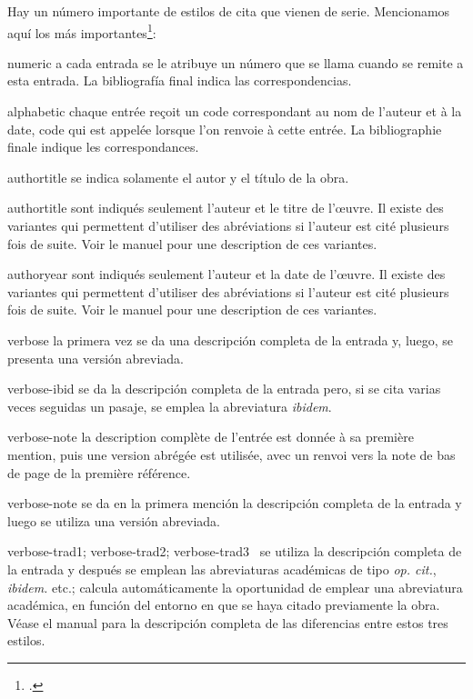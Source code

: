 Hay un número importante de estilos de cita que vienen de
serie. Mencionamos aquí los más importantes\footcite[Para más
detalles, véase][]{biblatex_style}:
\begin{choix}
\item[numeric]a cada entrada se le atribuye un número que se llama
  cuando se remite a esta entrada. La bibliografía final indica las correspondencias.
\item[alphabetic]chaque entrée reçoit un code correspondant au nom de l'auteur et à la date, code qui est appelée lorsque l'on renvoie à cette entrée. La bibliographie finale indique les correspondances.%
\item[authortitle]se indica solamente el autor y el título de la obra.
\item[authortitle]sont indiqués seulement l'auteur et le titre de l'œuvre. Il existe des variantes qui permettent d'utiliser des abréviations si l'auteur est cité plusieurs fois de suite. Voir le manuel pour une description de ces variantes.%
\item[authoryear]sont indiqués seulement l'auteur et la date de l'œuvre. Il existe des variantes qui permettent d'utiliser des abréviations si l'auteur est cité plusieurs fois de suite. Voir le manuel pour une description de ces variantes.%
\item[verbose]la primera vez se da una descripción completa de la
  entrada y, luego, se presenta una versión abreviada.
\item[verbose-ibid]se da la descripción completa de la entrada pero,
  si se cita varias veces seguidas un pasaje, se emplea la abreviatura \emph{ibidem}.
  \item[verbose-note]la description complète de l'entrée est donnée à sa première mention, puis une version abrégée est utilisée, avec un renvoi vers la note de bas de page de la première référence.%
\item[verbose-note]se da en la primera mención la descripción completa
  de la entrada y luego se utiliza una versión abreviada.
\item[verbose-trad1; verbose-trad2; verbose-trad3]~se utiliza la
  descripción completa de la entrada y después se emplean las abreviaturas
  académicas de tipo \emph{op. cit.}, \emph{ibidem.} etc.;
   calcula automáticamente la oportunidad de emplear
  una abreviatura académica, en función del entorno en que se haya
  citado previamente la obra. Véase el manual para la descripción
  completa de las diferencias entre estos tres estilos.
\end{choix}

